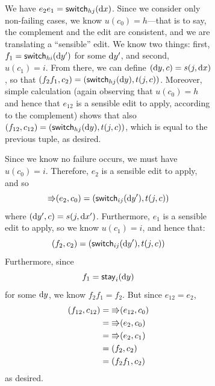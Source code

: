 \begin{figure}
\begin{figure}
\begin{pf}
\begin{trivlist}
 We have
            $e_2e_1=\mathsf{switch}_{hj}(\textrm{d} x)$. Since we consider only non-failing
            cases, we know $u(c_0)=h$---that is to say, the complement and the
            edit are consistent, and
            we are translating a ``sensible'' edit. We know two
            things: first, $f_1 = \mathsf{switch}_{hi}(\textrm{d} y')$ for some $\textrm{d} y'$, and
            second, $u(c_1)=i$. From there, we can define
            $(\textrm{d} y,c) = s(j,\textrm{d} x)$, 
            so that
            $(f_2f_1,c_2) = (\mathsf{switch}_{hj}(\textrm{d} y),t(j,c))$.
            Moreover, simple calculation (again observing that $u(c_0)=h$
            and hence that $e_{12}$ is a sensible edit to apply, according
            to the complement) shows that also
            $(f_{12},c_{12}) = (\mathsf{switch}_{hj}(\textrm{d} y),t(j,c))$,
            which is equal to the previous tuple, as desired.

\iffull
{} Since we know no
            failure occurs, we must have $u(c_0)=i$.
            Therefore, $e_2$ is a sensible edit to apply, and so
            \[\mathord{\Rrightarrow}(e_2,c_0) = (\mathsf{switch}_{ij}(\textrm{d} y'),t(j,c))\]
            where $(\textrm{d} y',c)=s(j,\textrm{d} x')$. Furthermore, $e_1$ is a sensible
            edit to apply, so we know $u(c_1)=i$, and hence that:
            \[(f_2,c_2) = (\mathsf{switch}_{ij}(\textrm{d} y'),t(j,c))\]
            Furthermore, since
            \[f_1 = \mathsf{stay}_i(\textrm{d} y)\]
            for some $\textrm{d} y$, we know $f_2f_1=f_2$. But since $e_{12}=e_2$,
            \begin{align*}
                (f_{12},c_{12}) &= \mathord{\Rrightarrow}(e_{12},c_0) \\
                &= \mathord{\Rrightarrow}(e_2,c_0) \\
                &= \mathord{\Rrightarrow}(e_2,c_1) \\
                &= (f_2,c_2) \\
                &= (f_2f_1,c_2)
            \end{align*}
            as desired.


\end{trivlist}
\end{pf}
\end{figure}
\end{figure}
